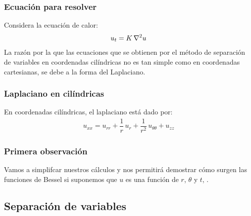 \documentclass[12pt]{beamer}
\begin{document}
\begin{frame}
\frametitle{Ecuación para resolver}
Considera la ecuación de calor:
\pause
\begin{align*}
u_{t} =  K \,  \laplacian{u}
\end{align*}
La razón por la que las ecuaciones que se obtienen por el método de separación de variables en coordenadas cilíndricas no es tan simple como en coordenadas cartesianas, se debe a la forma del Laplaciano. 
\end{frame}
\begin{frame}
\frametitle{Laplaciano en cilíndricas}
En coordenadas cilíndricas, el laplaciano está dado por:
\pause
\begin{align*}
u_{xx} = u_{rr} + \dfrac{1}{r} \, u_{r} + \dfrac{1}{r^{2}} \, u_{\theta \theta} + u_{zz}
\end{align*}
\end{frame}
\begin{frame}
\frametitle{Primera observación}
Vamos a simplifcar nuestros cálculos y nos permitirá demostrar cómo surgen las funciones de Bessel si suponemos que $u$ es una función de $r$, $\theta$ y $t$, .
\end{frame}

\subsection{Separación de variables}
\end{document}
